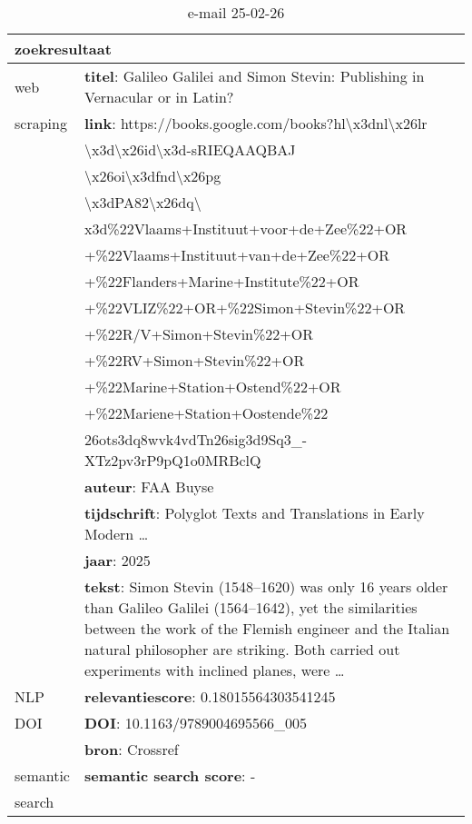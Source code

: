 \begin{table}[h!]
    \caption{e-mail 25-02-26}
    \centering
    \begin{tabularx}{\textwidth}{|p{4cm}|X|} 
        \hline
        \multicolumn{2}{|X|}{\textbf{zoekresultaat}} \\
        \hline
        web &\textbf{titel}: Galileo Galilei and Simon Stevin: Publishing in Vernacular or in Latin?\\
        scraping&\textbf{link}: https://books.google.com/books?hl\textbackslash x3dnl\textbackslash x26lr\\&\textbackslash x3d\textbackslash x26id\textbackslash x3d-sRIEQAAQBAJ\\&\textbackslash x26oi\textbackslash x3dfnd\textbackslash x26pg\\&\textbackslash x3dPA82\textbackslash x26dq\textbackslash \\&x3d\%22Vlaams+Instituut+voor+de+Zee\%22+OR\\&+\%22Vlaams+Instituut+van+de+Zee\%22+OR\\&+\%22Flanders+Marine+Institute\%22+OR\\&+\%22VLIZ\%22+OR+\%22Simon+Stevin\%22+OR\\&+\%22R/V+Simon+Stevin\%22+OR\\&+\%22RV+Simon+Stevin\%22+OR\\&+\%22Marine+Station+Ostend\%22+OR\\&+\%22Mariene+Station+Oostende\%22\\&\x26ots\x3dq8wvk4vdTn\x26sig\x3d9Sq3\_-XTz2pv3rP9pQ1o0MRBclQ\\
        &\textbf{auteur}: FAA Buyse\\
        &\textbf{tijdschrift}: Polyglot Texts and Translations in Early Modern …\\
        &\textbf{jaar}: 2025\\
        &\textbf{tekst}: Simon Stevin (1548–1620) was only 16 years older than Galileo Galilei (1564–1642), yet the similarities between the work of the Flemish engineer and the Italian natural philosopher are striking. Both carried out experiments with inclined planes, were …\\
        \hline
        NLP&\textbf{relevantiescore}: 0.18015564303541245\\
        \hline
        DOI&\textbf{DOI}: 10.1163/9789004695566\_005\\
        &\textbf{bron}: Crossref\\
        \hline
        semantic&\textbf{semantic search score}: -\\
        search&\\
        \hline
    \end{tabularx}
    \label{table:email20250226}
\end{table}
